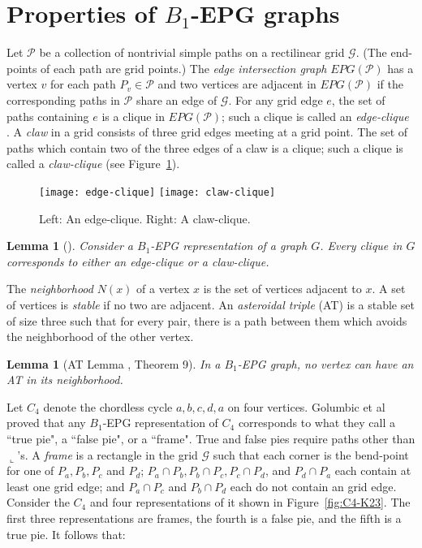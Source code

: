 \documentclass[11pt,3p,times]{elsarticle}
\newcommand{\La}{\ensuremath{\llcorner}} \newcommand{\Lb}{\ensuremath{\ulcorner}} \newcommand{\Lc}{\ensuremath{\lrcorner}} \newcommand{\Ld}{\ensuremath{\urcorner}}
\newtheorem{lemma}[theorem]{Lemma}
\begin{document}
\section{Properties of $B_1$-EPG graphs}\label{sec:properties}
Let $\mathcal{P}$ be a collection of nontrivial simple paths on a rectilinear
grid $\mathcal{G}$. (The end-points of each path are grid points.)
The \textit{edge intersection graph}
$EPG(\mathcal{P})$ has a vertex $v$ for each path $P_v \in
\mathcal{P}$ and two vertices are adjacent in $EPG(\mathcal{P})$
if the corresponding paths in $\mathcal{P}$ share an edge of
$\mathcal{G}$. For any grid edge $e$, the set of paths containing
$e$ is a clique in $EPG(\mathcal{P})$; such a clique is called an
\textit{edge-clique} \cite{Gol2009}. A \textit{claw} in a grid
consists of three grid edges meeting at a grid point.  The set of
paths which contain two of the three edges of a claw is a clique;
such a clique is called a \textit{claw-clique} \cite{Gol2009} (see
Figure~\ref{fig:edgeclique}).
\begin{figure}[h]
\hfill
\texttt{[image: edge-clique]}
\hfill
\texttt{[image: claw-clique]}
\hfill \ \caption{Left: An edge-clique. Right: A
claw-clique.}\label{fig:edgeclique}
\end{figure}
\begin{lemma}[\cite{Gol2009}]\label{lem:Gol2009}
Consider a $B_1$-EPG representation
of a graph $G$.
Every clique in $G$ corresponds to either an edge-clique or a claw-clique.
\end{lemma}


The \textit{neighborhood} $N(x)$ of a vertex $x$ is the set of vertices adjacent to $x$.
A set of vertices is \textit{stable} if no two are adjacent. An \textit{asteroidal triple}
(AT) is a stable set of size three such
that for every pair, there is a path between them which avoids the
neighborhood of the other vertex.

\begin{lemma}[AT Lemma \cite{Asi2012}, Theorem 9]\label{lem:AT}
In a $B_1$-EPG graph, no vertex can have an AT in its
neighborhood.
\end{lemma}

Let $C_4$ denote the chordless cycle $a,b,c,d,a$ on four vertices.
Golumbic et al \cite{Gol2009} proved that any $B_1$-EPG
representation of $C_4$ corresponds to what they call a ``true
pie", a ``false pie", or a ``frame".  True and false pies require
paths other than $\La$'s. A \textit{frame} is a rectangle in the
grid $\mathcal{G}$ such that each corner is the bend-point for one
of $P_a,P_b,P_c$ and $P_d$;  $P_a \cap P_b,P_b \cap P_c,P_c \cap
P_d$, and $P_d \cap P_a$ each contain at least one grid edge; and  $P_a
\cap P_c$ and $P_b \cap P_d$ each do not contain an grid edge. Consider
the $C_4$ and four representations of it shown in
Figure~\ref{fig:C4-K23}. The first three representations are frames,
the fourth is a false pie, and the fifth is a true pie. It follows
that:
\end{document}
